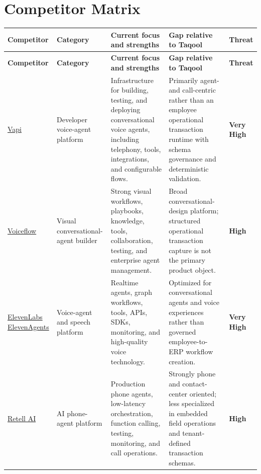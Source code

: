 \documentclass[10.5pt,a4paper]{article}
\newcommand{\BrandName}{Taqool}
\begin{document}
\section{Competitor Matrix}

\small
\begin{longtable}{L{25mm}L{27mm}L{48mm}L{51mm}L{16mm}}
\toprule
\textbf{Competitor} & \textbf{Category} & \textbf{Current focus and strengths} & \textbf{Gap relative to \BrandName} & \textbf{Threat} \\
\midrule
\endfirsthead

\toprule
\textbf{Competitor} & \textbf{Category} & \textbf{Current focus and strengths} & \textbf{Gap relative to \BrandName} & \textbf{Threat} \\
\midrule
\endhead

\href{https://vapi.ai/}{Vapi}
& Developer voice-agent platform
& Infrastructure for building, testing, and deploying conversational voice agents, including telephony, tools, integrations, and configurable flows.
& Primarily agent- and call-centric rather than an employee operational transaction runtime with schema governance and deterministic validation.
& \textbf{Very High} \\
\midrule

\href{https://www.voiceflow.com/}{Voiceflow}
& Visual conversational-agent builder
& Strong visual workflows, playbooks, knowledge, tools, collaboration, testing, and enterprise agent management.
& Broad conversational-design platform; structured operational transaction capture is not the primary product object.
& \textbf{High} \\
\midrule

\href{https://elevenlabs.io/voice-agents}{ElevenLabs ElevenAgents}
& Voice-agent and speech platform
& Realtime agents, graph workflows, tools, APIs, SDKs, monitoring, and high-quality voice technology.
& Optimized for conversational agents and voice experiences rather than governed employee-to-ERP workflow creation.
& \textbf{Very High} \\
\midrule

\href{https://www.retellai.com/}{Retell AI}
& AI phone-agent platform
& Production phone agents, low-latency orchestration, function calling, testing, monitoring, and call operations.
& Strongly phone and contact-center oriented; less specialized in embedded field operations and tenant-defined transaction schemas.
& \textbf{High} \\
\midrule


\end{longtable}
\end{document}
